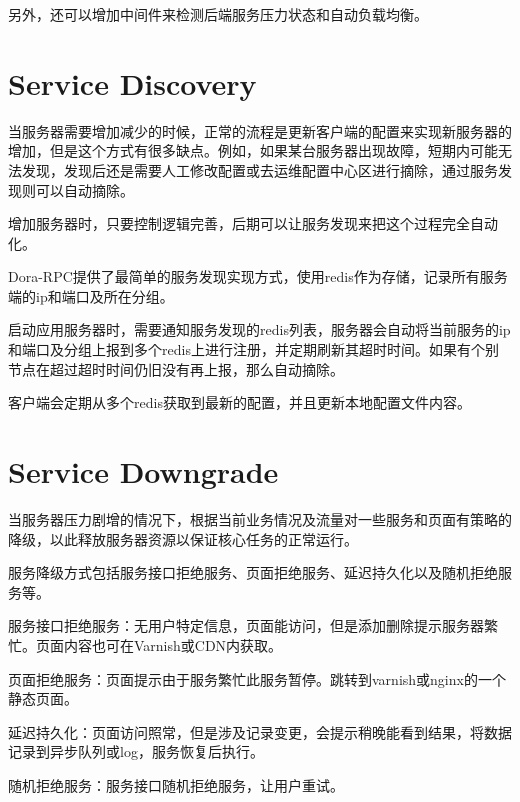 另外，还可以增加中间件来检测后端服务压力状态和自动负载均衡。


\section{Service Discovery}


当服务器需要增加减少的时候，正常的流程是更新客户端的配置来实现新服务器的增加，但是这个方式有很多缺点。例如，如果某台服务器出现故障，短期内可能无法发现，发现后还是需要人工修改配置或去运维配置中心区进行摘除，通过服务发现则可以自动摘除。

增加服务器时，只要控制逻辑完善，后期可以让服务发现来把这个过程完全自动化。


Dora-RPC提供了最简单的服务发现实现方式，使用redis作为存储，记录所有服务端的ip和端口及所在分组。


启动应用服务器时，需要通知服务发现的redis列表，服务器会自动将当前服务的ip和端口及分组上报到多个redis上进行注册，并定期刷新其超时时间。如果有个别节点在超过超时时间仍旧没有再上报，那么自动摘除。


客户端会定期从多个redis获取到最新的配置，并且更新本地配置文件内容。

\section{Service Downgrade}


当服务器压力剧增的情况下，根据当前业务情况及流量对一些服务和页面有策略的降级，以此释放服务器资源以保证核心任务的正常运行。


服务降级方式包括服务接口拒绝服务、页面拒绝服务、延迟持久化以及随机拒绝服务等。

\begin{compactitem}
\item 服务接口拒绝服务：无用户特定信息，页面能访问，但是添加删除提示服务器繁忙。页面内容也可在Varnish或CDN内获取。
\item  页面拒绝服务：页面提示由于服务繁忙此服务暂停。跳转到varnish或nginx的一个静态页面。
\item 延迟持久化：页面访问照常，但是涉及记录变更，会提示稍晚能看到结果，将数据记录到异步队列或log，服务恢复后执行。
\item 随机拒绝服务：服务接口随机拒绝服务，让用户重试。
\end{compactitem}



